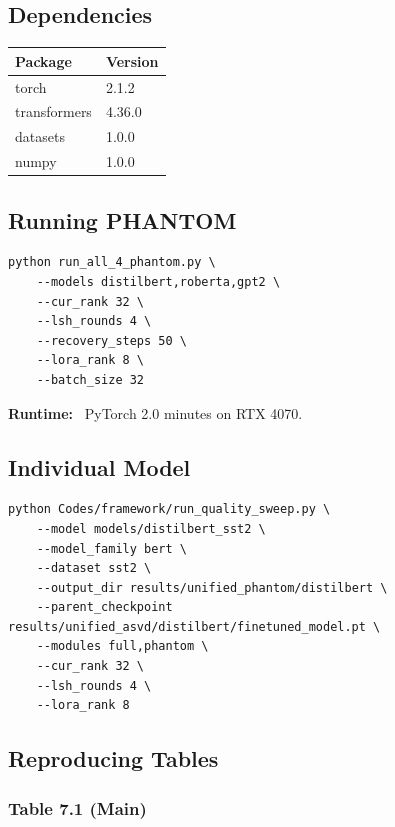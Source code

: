 \subsection{Dependencies}

\begin{table}[H]
\centering
\small
\begin{tabular}{ll}
\toprule
\textbf{Package} & \textbf{Version} \\
\midrule
torch & 2.1.2 \\
transformers & 4.36.0 \\
datasets & 1.0.0 \\
numpy & 1.0.0 \\
\bottomrule
\end{tabular}
\end{table}

\subsection{Running PHANTOM}

\begin{lstlisting}
python run_all_4_phantom.py \
    --models distilbert,roberta,gpt2 \
    --cur_rank 32 \
    --lsh_rounds 4 \
    --recovery_steps 50 \
    --lora_rank 8 \
    --batch_size 32
\end{lstlisting}

\textbf{Runtime:} ~PyTorch 2.0 minutes on RTX 4070.

\subsection{Individual Model}

\begin{lstlisting}
python Codes/framework/run_quality_sweep.py \
    --model models/distilbert_sst2 \
    --model_family bert \
    --dataset sst2 \
    --output_dir results/unified_phantom/distilbert \
    --parent_checkpoint results/unified_asvd/distilbert/finetuned_model.pt \
    --modules full,phantom \
    --cur_rank 32 \
    --lsh_rounds 4 \
    --lora_rank 8
\end{lstlisting}

\subsection{Reproducing Tables}

\subsubsection{Table 7.1 (Main)}

